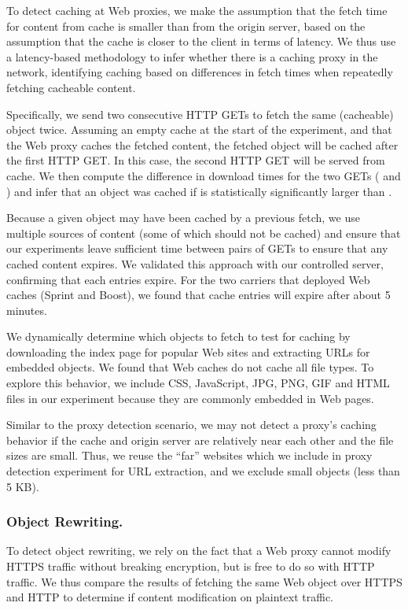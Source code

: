 To detect caching at Web proxies, we make the assumption that the fetch time for content from cache is smaller than from the origin server, based on the assumption that the cache is closer to the client in terms of latency. We thus use a latency-based methodology to infer whether there is a caching proxy in the network, identifying caching based on differences in fetch times when repeatedly fetching cacheable content. 

Specifically, we send two consecutive HTTP GETs to fetch the same (cacheable) object twice. Assuming an empty cache at the start of the experiment, and that the Web proxy caches the fetched content, the fetched object will be cached after the first HTTP GET. In this case, the second HTTP GET will be served from cache. We then compute the difference in download times for the two GETs ( and ) and infer that an object was cached if  is statistically significantly larger than . 

Because a given object may have been cached by a previous fetch, we use multiple sources of content (some of which should not be cached) and ensure that our experiments leave sufficient time between pairs of GETs to ensure that any cached content expires.  We validated this approach with our controlled server, confirming that each entries expire. For the two carriers that deployed Web caches (Sprint and Boost), we found that cache entries will expire after about 5 minutes.


We dynamically determine which objects to fetch to test for caching by downloading the index page for popular Web sites and extracting URLs for embedded objects. 
We found that Web caches do not cache all file types. To explore this behavior, we include CSS, JavaScript, JPG, PNG, GIF and HTML files in our experiment because they are commonly embedded in Web pages.


Similar to the proxy detection scenario, we may not detect a proxy's caching behavior if the cache and origin server are relatively near each other and the file sizes are small. Thus, we reuse the ``far'' websites which we include in proxy detection experiment for URL extraction, and we exclude small objects (less than 5 KB).


\vspace{-1em}
\subsubsection{Object Rewriting.}
To detect object rewriting, we rely on the fact that a Web proxy cannot modify HTTPS traffic without breaking encryption, but is free to do so with HTTP traffic. We thus compare the results of fetching the same Web object over HTTPS and HTTP to determine if content modification on plaintext traffic. 

